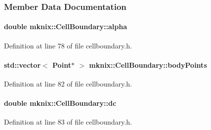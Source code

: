 \subsubsection{Member Data Documentation}
\hypertarget{classmknix_1_1_cell_boundary_acb76359011a0d0d6be9ed8e4cd24a4d5}{}
\paragraph[{alpha}]{\setlength{\rightskip}{0pt plus 5cm}double mknix\+::\+Cell\+Boundary\+::alpha\hspace{0.3cm}{\ttfamily [protected]}}\label{classmknix_1_1_cell_boundary_acb76359011a0d0d6be9ed8e4cd24a4d5}


Definition at line 78 of file cellboundary.\+h.

\hypertarget{classmknix_1_1_cell_boundary_ab69bec01bb7bb184f74e56f477b4e938}{}
\paragraph[{body\+Points}]{\setlength{\rightskip}{0pt plus 5cm}std\+::vector$<$ {\bf Point}$\ast$ $>$ mknix\+::\+Cell\+Boundary\+::body\+Points\hspace{0.3cm}{\ttfamily [protected]}}\label{classmknix_1_1_cell_boundary_ab69bec01bb7bb184f74e56f477b4e938}


Definition at line 82 of file cellboundary.\+h.

\hypertarget{classmknix_1_1_cell_boundary_ad70e12585e45e068a3dcb8dc98b1347f}{}
\paragraph[{dc}]{\setlength{\rightskip}{0pt plus 5cm}double mknix\+::\+Cell\+Boundary\+::dc\hspace{0.3cm}{\ttfamily [protected]}}\label{classmknix_1_1_cell_boundary_ad70e12585e45e068a3dcb8dc98b1347f}


Definition at line 83 of file cellboundary.\+h.

\hypertarget{classmknix_1_1_cell_boundary_af33b7951a3757bf0362ab8e3164d4bc4}{}
